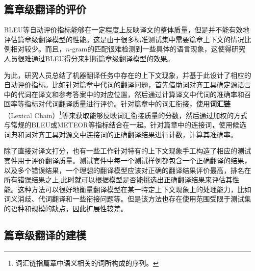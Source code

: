 
\subsection{篇章级翻译的评价}\label{sec:17-3-2}

\parinterval BLEU等自动评价指标能够在一定程度上反映译文的整体质量，但是并不能有效地评估篇章级翻译模型的性能。这是由于很多标准测试集中需要篇章上下文的情况比例相对较少。而且，$n$-gram的匹配很难检测到一些具体的语言现象，这使得研究人员很难通过BLEU得分来判断篇章级翻译模型的效果。

\parinterval 为此，研究人员总结了机器翻译任务中存在的上下文现象，并基于此设计了相应的自动评价指标。比如针对篇章中代词的翻译问题，首先借助词对齐工具确定源语言中的代词在译文和参考答案中的对应位置，然后通过计算译文中代词的准确率和召回率等指标对代词翻译质量进行评价。针对篇章中的词汇衔接，使用{\small\sffamily\bfseries{词汇链}}（Lexical Chain）\footnote{词汇链指篇章中语义相关的词所构成的序列。}等来获取能够反映词汇衔接质量的分数，然后通过加权的方式与常规的BLEU或METEOR等指标结合在一起。针对篇章中的连接词，使用候选词典和词对齐工具对源文中连接词的正确翻译结果进行计数，计算其准确率。

\parinterval 除了直接对译文打分，也有一些工作针对特有的上下文现象手工构造了相应的测试套件用于评价翻译质量。测试套件中每一个测试样例都包含一个正确翻译的结果，以及多个错误结果，一个理想的翻译模型应该对正确的翻译结果评价最高，排名在所有错误结果之上,此时就可以根据模型是否能挑选出正确翻译结果来评估其性能。这种方法可以很好地衡量翻译模型在某一特定上下文现象上的处理能力，比如词义消歧、代词翻译和一些衔接问题等。但是该方法也存在使用范围受限于测试集的语种和规模的缺点，因此扩展性较差。


\subsection{篇章级翻译的建模}

